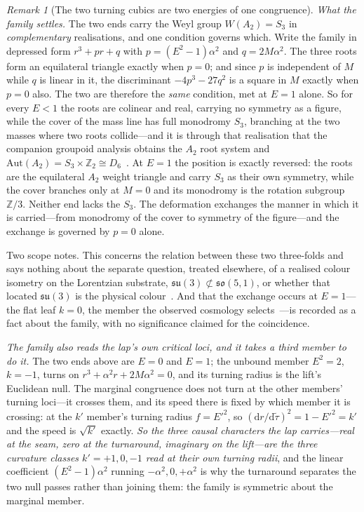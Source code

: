 \documentclass[11pt,a4paper]{article}
\theoremstyle{plain}
\theoremstyle{definition}
\theoremstyle{remark}
\newtheorem{remark}{Remark}
\begin{document}
\begin{remark}[The two turning cubics are two energies of one congruence]
\emph{What the family settles.} The two ends carry the Weyl group $W(A_2)=S_3$ in \emph{complementary} realisations, and one condition governs which. Write the family in depressed form $r^{3}+pr+q$ with $p=(E^{2}-1)\alpha^{2}$ and $q=2M\alpha^{2}$. The three roots form an equilateral triangle exactly when $p=0$; and since $p$ is independent of $M$ while $q$ is linear in it, the discriminant $-4p^{3}-27q^{2}$ is a square in $M$ exactly when $p=0$ also. The two are therefore the \emph{same} condition, met at $E=1$ alone. So for every $E<1$ the roots are colinear and real, carrying no symmetry as a figure, while the cover of the mass line has full monodromy $S_3$, branching at the two masses where two roots collide---and it is through that realisation that the companion groupoid analysis obtains the $A_2$ root system and $\mathrm{Aut}(A_2)=S_3\times\mathbb{Z}_2\cong D_6$~\cite{JanzenGroupoid}. At $E=1$ the position is exactly reversed: the roots are the equilateral $A_2$ weight triangle and carry $S_3$ as their own symmetry, while the cover branches only at $M=0$ and its monodromy is the rotation subgroup $\mathbb{Z}/3$. Neither end lacks the $S_3$. The deformation exchanges the manner in which it is carried---from monodromy of the cover to symmetry of the figure---and the exchange is governed by $p=0$ alone.

Two scope notes. This concerns the relation between these two three-folds and says nothing about the separate question,
treated elsewhere, of a realised colour isometry on the Lorentzian substrate, $\mathfrak{su}(3)\not\subset\mathfrak{so}(5,1)$, or whether that located $\mathfrak{su}(3)$ is the physical
colour~\cite{JanzenGroupoid,JanzenBoundary}. And that the exchange occurs at $E=1$---the flat leaf $k=0$, the member the observed cosmology selects~\cite{JanzenOperator}---is recorded as a fact about the family, with no significance claimed for the coincidence.

\emph{The family also reads the lap's own critical loci, and it takes a third member to do it.} The two ends above are $E=0$ and $E=1$; the unbound member $E^{2}=2$, $k=-1$, turns on $r^{3}+\alpha^{2}r+2M\alpha^{2}=0$, and its turning radius is the lift's Euclidean null. The marginal congruence does not turn at the other members' turning loci---it crosses them, and its speed there is fixed by which member it is crossing: at the $k'$ member's turning radius $f=E'^{2}$, so $(\mathrm{d}r/\mathrm{d}\tilde\tau)^{2}=1-E'^{2}=k'$ and the speed is $\sqrt{k'}$ exactly. \emph{So the three causal characters the lap carries---real at the seam, zero at the turnaround, imaginary on the lift---are the three curvature classes $k'=+1,0,-1$ read at their own turning radii}, and the linear coefficient $(E^{2}-1)\alpha^{2}$ running $-\alpha^{2},0,+\alpha^{2}$ is why the turnaround separates the two null passes rather than joining them: the family is symmetric about the marginal member.
\end{remark}
\end{document}
